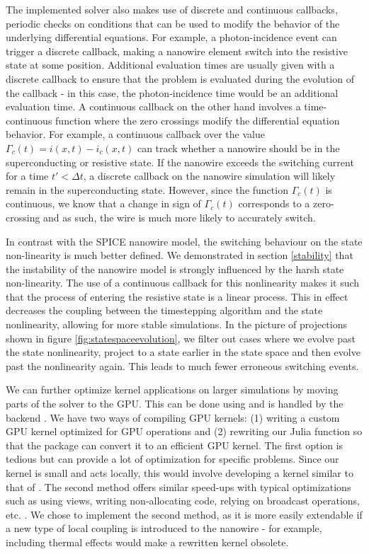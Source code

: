 The implemented solver also makes use of discrete and continuous callbacks, periodic checks on conditions
that can be used to modify the behavior of the underlying differential equations. For example, a photon-incidence
event can trigger a discrete callback, making a nanowire element switch into the resistive state at some position.
Additional evaluation times are usually given with a discrete callback to ensure that the problem is evaluated
during the evolution of the callback - in this case, the photon-incidence time would be an additional evaluation
time.
A continuous callback on the other hand involves a time-continuous function where the zero crossings modify
the differential equation behavior. For example, a continuous callback over the value $\Gamma_c(t) = i(x, t)-i_c(x, t)$ 
can track whether a nanowire should be in the superconducting or resistive state. If the nanowire exceeds
the switching current for a time $t' < \Delta t$, a discrete callback on the nanowire simulation will 
likely remain in the superconducting state. However, since the function $\Gamma_c(t)$ is continuous, we
know that a change in sign of $\Gamma_c(t)$ corresponds to a zero-crossing and as such, the wire is much more
likely to accurately switch.

In contrast with the SPICE nanowire model, the switching behaviour on the state non-linearity is much better
defined. We demonstrated in section \ref{stability} that the instability of the nanowire model is strongly
influenced by the harsh state non-linearity. The use of a continuous callback for this nonlinearity makes it
such that the process of entering the resistive state is a linear process. This in effect decreases the coupling
between the timestepping algorithm and the state nonlinearity, allowing for more stable simulations. In the 
picture of projections shown in figure \ref{fig:statespaceevolution}, we filter out cases where we evolve
past the state nonlinearity, project to a state earlier in the state space and then evolve past the nonlinearity
again. This leads to much fewer erroneous switching events.

We can further optimize kernel applications on larger simulations by moving parts of the solver to the GPU. 
This can be done using  and is handled by the  backend \cite{CUDAjl, diffeqgpu}. 
We have two ways of compiling GPU kernels: (1) writing a custom GPU kernel optimized for GPU operations and 
(2) rewriting our Julia function so that the  package can convert it to an efficient GPU
kernel. The first option is tedious but can provide a lot of optimization for specific problems.
Since our kernel is small and acts locally, this would involve developing a kernel similar to that of 
 \cite{prefixsumcuda, juliacon_gpu}. The second method offers similar speed-ups with typical 
optimizations such as using views, writing non-allocating code, relying on broadcast operations, etc. 
\cite{juliacon_gpu}. We chose to implement the second method, as it is more easily extendable
if a new type of local coupling is introduced to the nanowire - for example, including thermal effects 
would make a rewritten kernel obsolete.

